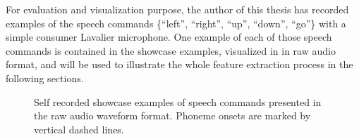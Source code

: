 For evaluation and visualization purpose, the author of this thesis has recorded examples of the speech commands \{\enquote{left}, \enquote{right}, \enquote{up}, \enquote{down}, \enquote{go}\} with a simple consumer Lavalier microphone.
One example of each of those speech commands is contained in the showcase examples, visualized in  in raw audio format, and will be used to illustrate the whole feature extraction process in the following sections.
\begin{figure}[!ht]
  \centering
    \quad
    \quad
  \caption{Self recorded showcase examples of speech commands presented in the raw audio waveform format. Phoneme onsets are marked by vertical dashed lines.}
  \label{fig:signal_raw_showcase}
\end{figure}
